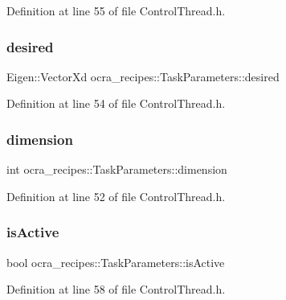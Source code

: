 Definition at line 55 of file Control\+Thread.\+h.

\hypertarget{classocra__recipes_1_1TaskParameters_a1dbe7dbb189079f4c8b7cd8f60a3b33e}{}\label{classocra__recipes_1_1TaskParameters_a1dbe7dbb189079f4c8b7cd8f60a3b33e} 
\subsubsection{\texorpdfstring{desired}{desired}}
{\footnotesize\ttfamily Eigen\+::\+Vector\+Xd ocra\+\_\+recipes\+::\+Task\+Parameters\+::desired}



Definition at line 54 of file Control\+Thread.\+h.

\hypertarget{classocra__recipes_1_1TaskParameters_a9102d4eee6b4dedb4bfb9181d348ed9c}{}\label{classocra__recipes_1_1TaskParameters_a9102d4eee6b4dedb4bfb9181d348ed9c} 
\subsubsection{\texorpdfstring{dimension}{dimension}}
{\footnotesize\ttfamily int ocra\+\_\+recipes\+::\+Task\+Parameters\+::dimension}



Definition at line 52 of file Control\+Thread.\+h.

\hypertarget{classocra__recipes_1_1TaskParameters_a1e4df01753f82bc359f9632817e61e2b}{}\label{classocra__recipes_1_1TaskParameters_a1e4df01753f82bc359f9632817e61e2b} 
\subsubsection{\texorpdfstring{is\+Active}{isActive}}
{\footnotesize\ttfamily bool ocra\+\_\+recipes\+::\+Task\+Parameters\+::is\+Active}



Definition at line 58 of file Control\+Thread.\+h.

